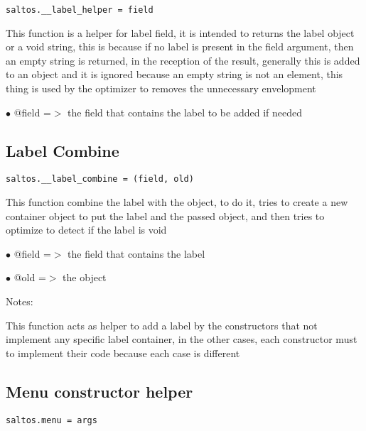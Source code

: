 \documentclass[a4paper]{book}
\begin{document}
\begin{lstlisting}
saltos.__label_helper = field
\end{lstlisting}

This function is a helper for label field, it is intended to returns the
label object or a void string, this is because if no label is present in
the field argument, then an empty string is returned, in the reception
of the result, generally this is added to an object and it is ignored
because an empty string is not an element, this thing is used by the
optimizer to removes the unnecessary envelopment

\begin{compactitem}
\item[\color{myblue}$\bullet$] @field =$>$ the field that contains the label to be added if needed
\end{compactitem}

\hypertarget{toc409}{}
\subsection{Label Combine}

\begin{lstlisting}
saltos.__label_combine = (field, old)
\end{lstlisting}

This function combine the label with the object, to do it, tries to create a new
container object to put the label and the passed object, and then tries to optimize
to detect if the label is void

\begin{compactitem}
\item[\color{myblue}$\bullet$] @field =$>$ the field that contains the label
\item[\color{myblue}$\bullet$] @old   =$>$ the object
\end{compactitem}

Notes:

This function acts as helper to add a label by the constructors that not implement
any specific label container, in the other cases, each constructor must to implement
their code because each case is different

\hypertarget{toc410}{}
\subsection{Menu constructor helper}

\begin{lstlisting}
saltos.menu = args
\end{lstlisting}
\end{document}
